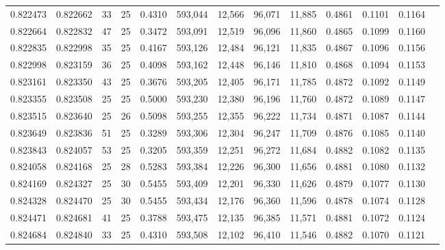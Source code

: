 \begin{tabular}{rrrrrrrrrrrrr}
0.822473 & 0.822662 &    33 &  25 &                                     0.4310 & 593,044 &  12,566 &  96,071 &  11,885 & 0.4861 & 0.1101 & 0.1164 \\
0.822664 & 0.822832 &    47 &  25 &                                     0.3472 & 593,091 &  12,519 &  96,096 &  11,860 & 0.4865 & 0.1099 & 0.1160 \\
0.822835 & 0.822998 &    35 &  25 &                                     0.4167 & 593,126 &  12,484 &  96,121 &  11,835 & 0.4867 & 0.1096 & 0.1156 \\
0.822998 & 0.823159 &    36 &  25 &                                     0.4098 & 593,162 &  12,448 &  96,146 &  11,810 & 0.4868 & 0.1094 & 0.1153 \\
0.823161 & 0.823350 &    43 &  25 &                                     0.3676 & 593,205 &  12,405 &  96,171 &  11,785 & 0.4872 & 0.1092 & 0.1149 \\
0.823355 & 0.823508 &    25 &  25 &                                     0.5000 & 593,230 &  12,380 &  96,196 &  11,760 & 0.4872 & 0.1089 & 0.1147 \\
0.823515 & 0.823640 &    25 &  26 &                                     0.5098 & 593,255 &  12,355 &  96,222 &  11,734 & 0.4871 & 0.1087 & 0.1144 \\
0.823649 & 0.823836 &    51 &  25 &                                     0.3289 & 593,306 &  12,304 &  96,247 &  11,709 & 0.4876 & 0.1085 & 0.1140 \\
0.823843 & 0.824057 &    53 &  25 &                                     0.3205 & 593,359 &  12,251 &  96,272 &  11,684 & 0.4882 & 0.1082 & 0.1135 \\
0.824058 & 0.824168 &    25 &  28 &                                     0.5283 & 593,384 &  12,226 &  96,300 &  11,656 & 0.4881 & 0.1080 & 0.1132 \\
0.824169 & 0.824327 &    25 &  30 &                                     0.5455 & 593,409 &  12,201 &  96,330 &  11,626 & 0.4879 & 0.1077 & 0.1130 \\
0.824328 & 0.824470 &    25 &  30 &                                     0.5455 & 593,434 &  12,176 &  96,360 &  11,596 & 0.4878 & 0.1074 & 0.1128 \\
0.824471 & 0.824681 &    41 &  25 &                                     0.3788 & 593,475 &  12,135 &  96,385 &  11,571 & 0.4881 & 0.1072 & 0.1124 \\
0.824684 & 0.824840 &    33 &  25 &                                     0.4310 & 593,508 &  12,102 &  96,410 &  11,546 & 0.4882 & 0.1070 & 0.1121 \\

\end{tabular}
